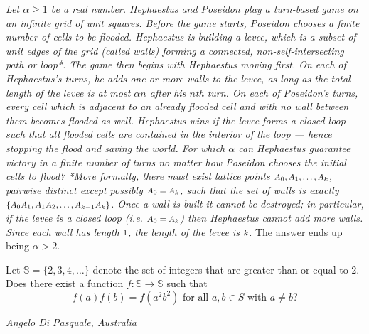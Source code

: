 \documentclass[fontsize=9pt]{scrartcl}
\begin{document}
	\textit{ Let $\alpha \geq 1$ be a real number. Hephaestus and Poseidon play a
	turn-based game on an infinite grid of unit squares. Before the game starts,
	Poseidon chooses a finite number of cells to be flooded. Hephaestus is building
	a levee, which is a subset of unit edges of the grid (called walls) forming a
	connected, non-self-intersecting path or loop*. The game then begins with Hephaestus
	moving first. On each of Hephaestus’s turns, he adds one or more walls to the levee,
	as long as the total length of the levee is at most $\alpha n$ after his $n$th
	turn. On each of Poseidon’s turns, every cell which is adjacent to an already flooded
	cell and with no wall between them becomes flooded as well. Hephaestus wins if
	the levee forms a closed loop such that all flooded cells are contained in the
	interior of the loop — hence stopping the flood and saving the world. For which
	$\alpha$ can Hephaestus guarantee victory in a finite number of turns no matter
	how Poseidon chooses the initial cells to flood?
	\newline
	*More formally, there must exist lattice points
	$\mbox{\footnotesize $A_{0}, A_{1}, \dotsc, A_{k}$}$, pairwise distinct except
	possibly $\mbox{\footnotesize $A_{0} = A_{k}$}$, such that the set of walls is
	exactly
	$\mbox{\footnotesize $\{A_{0}A_{1}, A_{1}A_{2}, \dotsc , A_{k-1}A_{k}\}$}$. Once
	a wall is built it cannot be destroyed; in particular, if the levee is a closed
	loop (i.e. $\mbox{\footnotesize $A_{0} = A_{k}$}$) then Hephaestus cannot add
	more walls. Since each wall has length $\mbox{\footnotesize $1$}$, the length
	of the levee is $\mbox{\footnotesize $k$}$. }
	\newline
	The answer ends up being $\alpha > 2.$ ~\\

	\begin{tcolorbox}
		[colback=white!5!white,colframe=purple!75!white,title=\textsf{Problem 2: (APMO
		2015)}, opacityback=1] Let $\mathbb{S}= \{2, 3, 4, \ldots\}$ denote the set of
		integers that are greater than or equal to $2$. Does there exist a function
		$f : \mathbb{S}\to \mathbb{S}$ such that
		\[
			f (a)f (b) = f (a^{2} b^{2} )\text{ for all }a, b \in S\text{ with }a \ne b
			?
		\]
	\end{tcolorbox}
	\hfill \emph{Angelo Di Pasquale, Australia}
\end{document}

